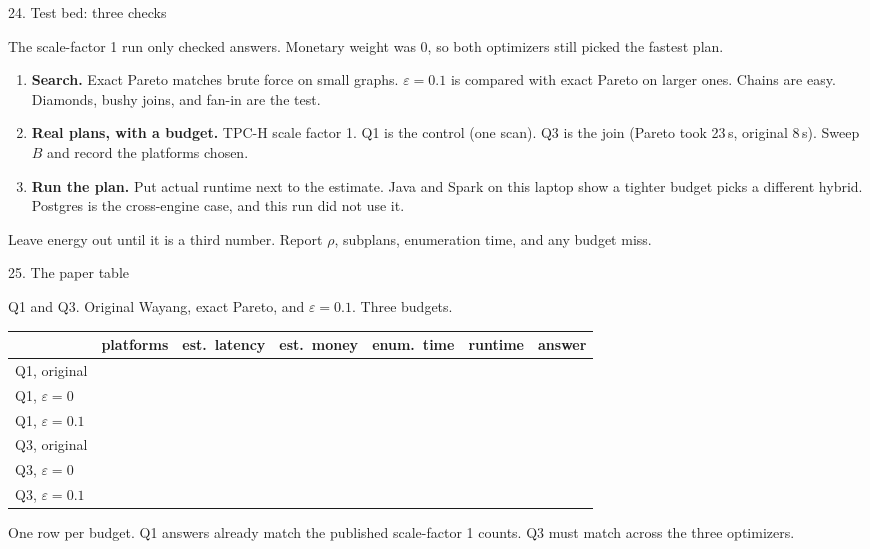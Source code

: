 \documentclass[aspectratio=169,11pt]{beamer}
\begin{document}
\begin{frame}{24. Test bed: three checks}

{\small The scale-factor 1 run only checked answers. Monetary weight was 0, so both optimizers still picked the fastest plan.}

\vspace{0.3cm}
\begin{enumerate}
\item \textbf{Search.} Exact Pareto matches brute force on small graphs. \(\varepsilon=0.1\) is compared with exact Pareto on larger ones. Chains are easy. Diamonds, bushy joins, and fan-in are the test.
\item \textbf{Real plans, with a budget.} TPC-H scale factor 1. Q1 is the control (one scan). Q3 is the join (Pareto took 23\,s, original 8\,s). Sweep \(B\) and record the platforms chosen.
\item \textbf{Run the plan.} Put actual runtime next to the estimate. Java and Spark on this laptop show a tighter budget picks a different hybrid. Postgres is the cross-engine case, and this run did not use it.
\end{enumerate}

\vspace{0.2cm}
{\small Leave energy out until it is a third number. Report \(\rho\), subplans, enumeration time, and any budget miss.}
\end{frame}

\begin{frame}{25. The paper table}

\centering
{\small Q1 and Q3. Original Wayang, exact Pareto, and \(\varepsilon=0.1\). Three budgets.}

\vspace{0.35cm}
\renewcommand{\arraystretch}{1.2}
\setlength{\tabcolsep}{5pt}
{\scriptsize
\begin{tabular}{@{}lcccccc@{}}
\toprule
& platforms & est.\ latency & est.\ money & enum.\ time & runtime & answer \\
\midrule
Q1, original & & & & & & \\
Q1, \(\varepsilon=0\) & & & & & & \\
Q1, \(\varepsilon=0.1\) & & & & & & \\
Q3, original & & & & & & \\
Q3, \(\varepsilon=0\) & & & & & & \\
Q3, \(\varepsilon=0.1\) & & & & & & \\
\bottomrule
\end{tabular}}

\vspace{0.4cm}
{\small One row per budget. Q1 answers already match the published scale-factor 1 counts. Q3 must match across the three optimizers.}
\end{frame}
\end{document}
